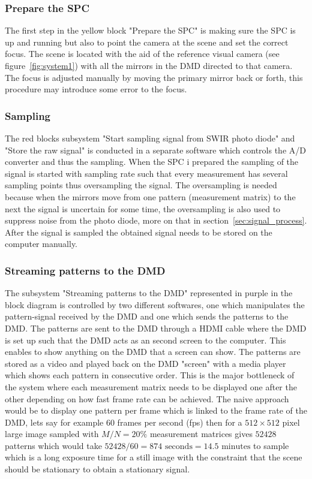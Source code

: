  
\subsubsection{Prepare the SPC}
The first step in the yellow block "Prepare the SPC" is making sure the SPC is up and running but also to point the camera at the scene and set the correct focus. The scene is located with the aid of the reference visual camera (see figure~\ref{fig:system1}) with all the mirrors in the DMD directed to that camera. The focus is adjusted manually by moving the primary mirror back or forth, this procedure may introduce some error to the focus.\\[0.1in]

\subsubsection{Sampling}
The red blocks subsystem "Start sampling signal from SWIR photo diode" and "Store the raw signal" is conducted in a separate software which controls the A/D converter and thus the sampling. When the SPC i prepared the sampling of the signal is started with sampling rate such that every measurement has several sampling points thus oversampling the signal. The oversampling is needed because when the mirrors move from one pattern (measurement matrix) to the next the signal is uncertain for some time, the oversampling is also used to suppress noise from the photo diode, more on that in section~\ref{sec:signal_process}. After the signal is sampled the obtained signal needs to be stored on the computer manually.

\subsubsection{Streaming patterns to the DMD}
\label{sec:stream_dmd}
The subsystem "Streaming patterns to the DMD" represented in purple in the block diagram is controlled by two different softwares, one which manipulates the pattern-signal received by the DMD and one which sends the patterns to the DMD. The patterns are sent to the DMD through a HDMI cable where the DMD is set up such that the DMD acts as an second screen to the computer. This enables to show anything on the DMD that a screen can show. The patterns are stored as a video and played back on the DMD "screen" with a media player which shows each pattern in consecutive order. This is the major bottleneck of the system where each measurement matrix needs to be displayed one after the other depending on how fast frame rate can be achieved. The naive approach would be to display one pattern per frame which is linked to the frame rate of the DMD, lets say for example 60 frames per second (fps) then for a $512\times 512$ pixel large image sampled with $M/N = 20\%$ measurement matrices gives $52428$ patterns which would take $52428/60 = 874 \text{ seconds} = 14.5 \text{ minutes}$ to sample which is a long exposure time for a still image with the constraint that the scene should be stationary to obtain a stationary signal.\\[0.1in]

